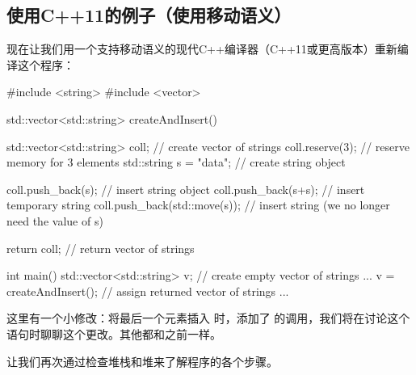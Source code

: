 \subsection{使用C++11的例子（使用移动语义）}

现在让我们用一个支持移动语义的现代C++编译器（C++11或更高版本）重新编译这个程序：

\begin{cppcode}
#include <string>
#include <vector>

std::vector<std::string> createAndInsert()
{
	std::vector<std::string> coll; // create vector of strings
	coll.reserve(3); // reserve memory for 3 elements
	std::string s = "data"; // create string object

	coll.push_back(s); // insert string object
	coll.push_back(s+s); // insert temporary string
	coll.push_back(std::move(s)); // insert string (we no longer need the value of s)

	return coll; // return vector of strings
}

int main()
{
	std::vector<std::string> v; // create empty vector of strings
	...
	v = createAndInsert(); // assign returned vector of strings
	...
}
\end{cppcode}

这里有一个小修改：将最后一个元素插入  时，添加了  的调用，我们将在讨论这个语句时聊聊这个更改。其他都和之前一样。

让我们再次通过检查堆栈和堆来了解程序的各个步骤。

